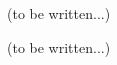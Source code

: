 (to be written...)



(to be written...)

\clearrightpage
\begin{appendices}
\end{appendices}

\clearrightpage

